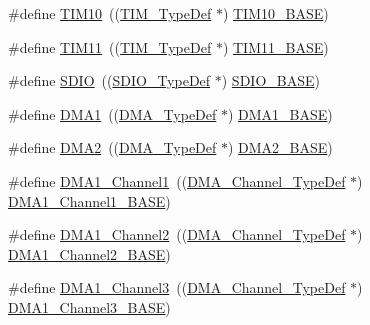 \begin{DoxyCompactItemize}
\item 
\#define \mbox{\hyperlink{group___peripheral__declaration_ga46b2ad3f5f506f0f8df0d2ec3e767267}{T\+I\+M10}}~((\mbox{\hyperlink{struct_t_i_m___type_def}{T\+I\+M\+\_\+\+Type\+Def}} $\ast$) \mbox{\hyperlink{group___peripheral__memory__map_ga3eff32f3801db31fb4b61d5618cad54a}{T\+I\+M10\+\_\+\+B\+A\+SE}})
\item 
\#define \mbox{\hyperlink{group___peripheral__declaration_gacfd11ef966c7165f57e2cebe0abc71ad}{T\+I\+M11}}~((\mbox{\hyperlink{struct_t_i_m___type_def}{T\+I\+M\+\_\+\+Type\+Def}} $\ast$) \mbox{\hyperlink{group___peripheral__memory__map_ga3a4a06bb84c703084f0509e105ffaf1d}{T\+I\+M11\+\_\+\+B\+A\+SE}})
\item 
\#define \mbox{\hyperlink{group___peripheral__declaration_ga8149aa2760fffac16bc75216d5fd9331}{S\+D\+IO}}~((\mbox{\hyperlink{struct_s_d_i_o___type_def}{S\+D\+I\+O\+\_\+\+Type\+Def}} $\ast$) \mbox{\hyperlink{group___peripheral__memory__map_ga95dd0abbc6767893b4b02935fa846f52}{S\+D\+I\+O\+\_\+\+B\+A\+SE}})
\item 
\#define \mbox{\hyperlink{group___peripheral__declaration_gacc16d2a5937f7585320a98f7f6b578f9}{D\+M\+A1}}~((\mbox{\hyperlink{struct_d_m_a___type_def}{D\+M\+A\+\_\+\+Type\+Def}} $\ast$) \mbox{\hyperlink{group___peripheral__memory__map_gab2d8a917a0e4ea99a22ac6ebf279bc72}{D\+M\+A1\+\_\+\+B\+A\+SE}})
\item 
\#define \mbox{\hyperlink{group___peripheral__declaration_ga506520140eec1708bc7570c49bdf972d}{D\+M\+A2}}~((\mbox{\hyperlink{struct_d_m_a___type_def}{D\+M\+A\+\_\+\+Type\+Def}} $\ast$) \mbox{\hyperlink{group___peripheral__memory__map_gab72a9ae145053ee13d1d491fb5c1df64}{D\+M\+A2\+\_\+\+B\+A\+SE}})
\item 
\#define \mbox{\hyperlink{group___peripheral__declaration_gac83c5be824be1c02716e2522e80ddf7a}{D\+M\+A1\+\_\+\+Channel1}}~((\mbox{\hyperlink{struct_d_m_a___channel___type_def}{D\+M\+A\+\_\+\+Channel\+\_\+\+Type\+Def}} $\ast$) \mbox{\hyperlink{group___peripheral__memory__map_ga888dbc1608243badeb3554ffedc7364c}{D\+M\+A1\+\_\+\+Channel1\+\_\+\+B\+A\+SE}})
\item 
\#define \mbox{\hyperlink{group___peripheral__declaration_ga23d7631dd10c645e06971b2543ba2949}{D\+M\+A1\+\_\+\+Channel2}}~((\mbox{\hyperlink{struct_d_m_a___channel___type_def}{D\+M\+A\+\_\+\+Channel\+\_\+\+Type\+Def}} $\ast$) \mbox{\hyperlink{group___peripheral__memory__map_ga38a70090eef3687e83fa6ac0c6d22267}{D\+M\+A1\+\_\+\+Channel2\+\_\+\+B\+A\+SE}})
\item 
\#define \mbox{\hyperlink{group___peripheral__declaration_gacf7b6093a37b306d7f1f50b2f200f0d0}{D\+M\+A1\+\_\+\+Channel3}}~((\mbox{\hyperlink{struct_d_m_a___channel___type_def}{D\+M\+A\+\_\+\+Channel\+\_\+\+Type\+Def}} $\ast$) \mbox{\hyperlink{group___peripheral__memory__map_ga70b3d9f36ca9ce95b4e421c11154fe5d}{D\+M\+A1\+\_\+\+Channel3\+\_\+\+B\+A\+SE}})

\end{DoxyCompactItemize}
